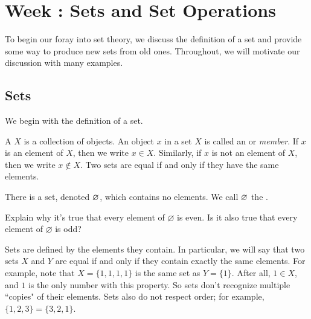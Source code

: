 \documentclass[../notes.tex]{subfiles}
\begin{document}
\section{Week \theweek: Sets and Set Operations}
To begin our foray into set theory, we discuss the definition of a set and provide some way to produce new sets from old ones. Throughout, we will motivate our discussion with many examples.

\subsection{Sets}
We begin with the definition of a set.
\begin{definition}
    A  $X$ is a collection of objects. An object $x$ in a set $X$ is called an  or \emph{member}. If $x$ is an element of $X$, then we write $x \in X$. Similarly, if $x$ is not an element of $X$, then we write $x \notin X$. Two sets are equal if and only if they have the same elements.
\end{definition}
\begin{example}
    There is a set, denoted $\varnothing$, which contains no elements. We call $\varnothing$ the .
\end{example}
\begin{exercise}
    Explain why it's true that every element of $\varnothing$ is even. Is it also true that every element of $\varnothing$ is odd? 
\end{exercise}
Sets are defined by the elements they contain. In particular, we will say that two sets $X$ and $Y$ are equal if and only if they contain exactly the same elements. For example, note that $X = \{1, 1, 1, 1\}$ is the same set as $Y = \{1\}$. After all, $1 \in X$, and $1$ is the only number with this property. So sets don't recognize multiple ``copies" of their elements. Sets also do not respect order; for example, $\{1, 2, 3\} = \{3, 2, 1\}$.
\end{document}
